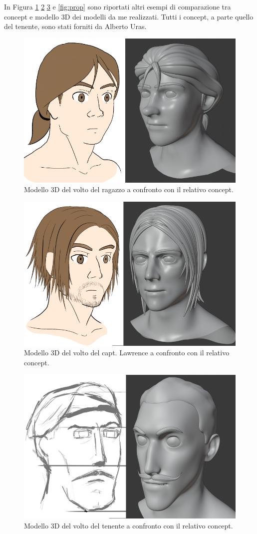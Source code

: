 In Figura \ref{fig:boy} \ref{fig:cap} \ref{fig:lt} e \ref{fig:prop} sono riportati altri esempi di comparazione tra concept e modello 3D dei modelli da me realizzati. Tutti i concept, a parte quello del tenente, sono stati forniti da Alberto Uras. 
\begin{figure}
\centering
\includegraphics[width=.8\textwidth]{Figures/boy}
\decoRule
\caption[Ragazzo]{Modello 3D del volto del ragazzo a confronto con il relativo concept.}
\label{fig:boy}
\end{figure}
\begin{figure}
\centering
\includegraphics[width=.8\textwidth]{Figures/cap}
\decoRule
\caption[Capitano]{Modello 3D del volto del capt. Lawrence a confronto con il relativo concept.}
\label{fig:cap}
\end{figure}
\begin{figure}
\centering
\includegraphics[width=.8\textwidth]{Figures/lt}
\decoRule
\caption[Tenente]{Modello 3D del volto del tenente a confronto con il relativo concept.}
\label{fig:lt}
\end{figure}
